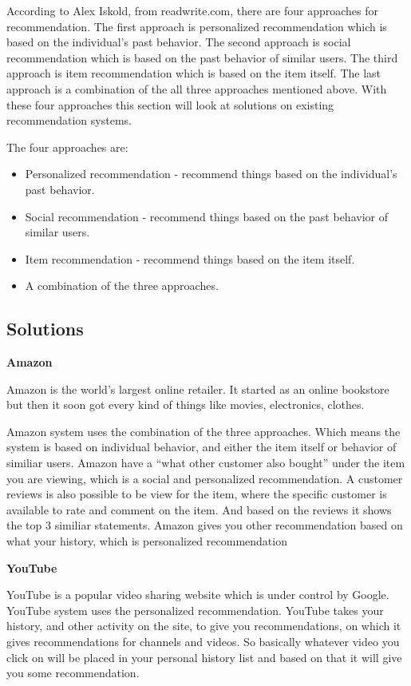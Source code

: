 According to Alex Iskold, from readwrite.com, there are four approaches for recommendation. The first approach is personalized recommendation which is based on the individual’s past behavior. The second approach is social recommendation which is based on the past behavior of similar users. The third approach is item recommendation which is based on the item itself. The last approach is a combination of the all three approaches mentioned above. With these four approaches this section will look at solutions on existing recommendation systems.

The four approaches are:

\begin{itemize}
	\item Personalized recommendation - recommend things based on the individual’s past behavior. 
	\item Social recommendation - recommend things based on the past behavior  of similar users. 
	\item Item recommendation - recommend things based on the item itself.
	\item A combination of the three approaches.
\end{itemize}

\subsection{Solutions}
\textbf{Amazon}

Amazon is the world’s largest online retailer. It started as an online bookstore but then it soon got every kind of things like movies, electronics, clothes.

Amazon system uses the combination of the three approaches. Which means the system is based on individual behavior, and either the item itself or behavior of similiar users. Amazon have a “what other customer also bought” under the item you are viewing, which is a social and personalized recommendation. A customer reviews is also possible to be view for the item, where the specific customer is available to rate and comment on the item. And based on the reviews it shows the top 3 similiar statements. Amazon gives you other recommendation based on what your history, which is personalized recommendation

\textbf{YouTube}

YouTube is a popular video sharing website which is under control by Google. YouTube system uses the personalized recommendation. YouTube takes your history, and other activity on the site, to give you recommendations, on which it gives recommendations for channels and videos. So basically whatever video you click on will be placed in your personal history list and based on that it will give you some recommendation.

